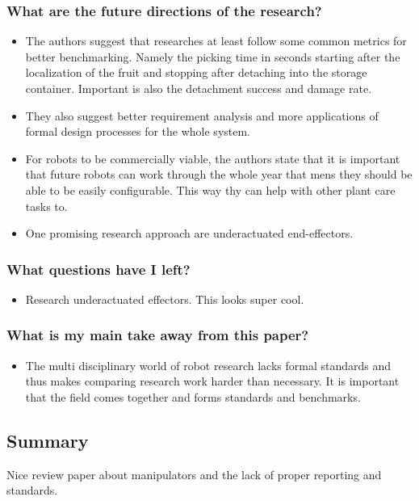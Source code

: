    \subsubsection*{What are the future directions of the research?}
    \begin{itemize}
        \item The authors suggest that researches at least follow some common metrics for better benchmarking. Namely the picking time in seconds starting after the localization of the fruit and stopping after detaching into the storage container. Important is also the detachment success and damage rate.
        \item They also suggest better requirement analysis and more applications of formal design processes for the whole system.
        \item For robots to be commercially viable, the authors state that it is important that future robots can work through the whole year that mens they should be able to be easily configurable. This way thy can help with other plant care tasks to.  
        \item One promising research approach are underactuated end-effectors. 
    \end{itemize}
    \subsubsection*{What questions have I left?}
    \begin{itemize}
        \item Research underactuated effectors. This looks super cool.
    \end{itemize}
    \subsubsection*{What is my main take away from this paper?}
    \begin{itemize}
        \item The multi disciplinary world of robot research lacks formal standards and thus makes comparing research work harder than necessary. It is important that the field comes together and forms standards and benchmarks.
    \end{itemize}
    
    \subsection*{Summary}
    Nice review paper about manipulators and the lack of proper reporting and standards.
    

